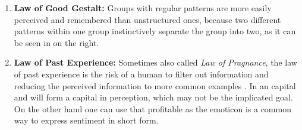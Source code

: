 \begin{enumerate}
    \item \textbf{Law of Good Gestalt:} Groups with regular patterns are more easily perceived and remembered than unstructured ones, because two different patterns within one group instinctively separate the group into two, as it can be seen in  \parencite{Todorovic.2008} on the right. 
    
    \item \textbf{Law of Past Experience:} Sometimes also called \textit{Law of Pragnance}, the law of past experience is the risk of a human to filter out information and reducing the perceived information to more common examples \parencite{Stevenson.n.y.}. In  an capital  and  will form a capital  in perception, which may not be the implicated goal. On the other hand one can use that profitable as the emoticon is a common way to express sentiment in short form.
    

\end{enumerate}
